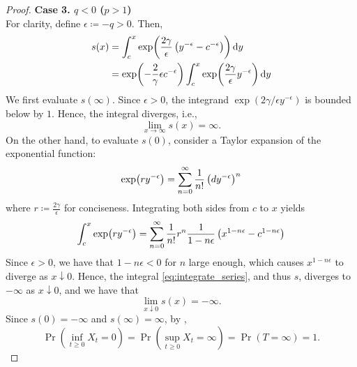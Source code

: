\documentclass[twocolumn,amsthm]{autart}
\newcommand{\lft}{\mathopen{}\mathclose\bgroup\left}
\newcommand{\rht}{\aftergroup\egroup\right}
\begin{document}
\begin{appendix}
\begin{proof}
\textbf{Case 3. $q < 0$ ($p > 1$)}\\
    For clarity, define $\epsilon \coloneqq -q > 0$. Then,
    \begin{align}
        s(x)
        &= \int_c^x \exp\lft( \frac{2 \gamma}{\epsilon} \left( y^{-\epsilon} - c^{-\epsilon} \right) \rht) \dd{y} \\
        &= \exp\lft(-\frac{2}{\gamma}{\epsilon} c^{-\epsilon}\rht) \int_c^x \exp\lft( \frac{2 \gamma}{\epsilon} y^{-\epsilon} \rht) \dd{y}
    \end{align}
    We first evaluate $s(\infty)$. Since $\epsilon > 0$, the integrand $\exp(2\gamma/\epsilon y^{-\epsilon})$ is bounded below by $1$. Hence, the integral diverges, i.e.,
    \begin{equation}
        \lim_{x \to \infty} s(x) = \infty.
    \end{equation}
    On the other hand, to evaluate $s(0)$, consider a Taylor expansion of the exponential function:
    \begin{equation}
        \exp\lft( r y^{-\epsilon} \rht) = \sum_{n=0}^\infty \frac{1}{n!} \left(d y^{-\epsilon} \right)^n
    \end{equation}
    where $r \coloneqq \frac{2 \gamma}{\epsilon}$ for conciseness.
    Integrating both sides from $c$ to $x$ yields
    \begin{equation} \label{eq:integrate_series}
        \int_c^x \exp\lft( r y^{-\epsilon} \rht) = \sum_{n=0}^\infty \frac{1}{n!} r^n \frac{1}{1 - n \epsilon} \left( x^{1 - n \epsilon} - c^{1-n\epsilon} \right)
    \end{equation}
    Since $\epsilon > 0$, we have that $1 - n \epsilon < 0$ for $n$ large enough, which causes $x^{1 - n \epsilon}$ to diverge as $x \downarrow 0$. Hence, the integral \eqref{eq:integrate_series}, and thus $s$, diverges to $-\infty$ as $x \downarrow 0$, and we have that
    \begin{equation}
        \lim_{x \downarrow 0} s(x) = -\infty.
    \end{equation}
    Since $s(0) = -\infty$ and $s(\infty) = \infty$, by ,
    \begin{equation}
        \Pr( \inf_{t \geq 0} X_t = 0) = \Pr( \sup_{t \geq 0} X_t = \infty) = \Pr( T = \infty) = 1.
    \end{equation}
\end{proof}

\end{appendix}

        
\end{document}
